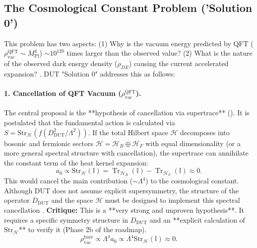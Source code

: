 \documentclass[11pt, a4paper]{article}
\theoremstyle{remark}
\newcommand{\Str}{\mathrm{Str}}
\DeclareMathOperator{\Tr}{Tr}
\newcommand{\Mpl}{M_{\mathrm{Pl}}}
\begin{document}
\subsection{The Cosmological Constant Problem ('Solution 0')}
\label{sec:problema_cc_final_revised}
This problem has two aspects: (1) Why is the vacuum energy predicted by QFT (\( \rho_{\text{vac}}^{\text{QFT}} \sim \Mpl^4 \)) \( \sim 10^{120} \) times larger than the observed value? (2) What is the nature of the observed dark energy density (\( \rho_{DE} \)) causing the current accelerated expansion? \citep{Weinberg1989CosmoConst}.
DUT "Solution 0" addresses this as follows:

\paragraph{1. Cancellation of QFT Vacuum (\( \rho_{\text{vac}}^{\text{QFT}} \)).}
The central proposal is the **hypothesis of cancellation via supertrace** (). It is postulated that the fundamental action is calculated via \( S = \Str_{\mathcal{H}}(f(D_{\text{DUT}}^2/\Lambda^2)) \). If the total Hilbert space \( \mathcal{H} \) decomposes into bosonic and fermionic sectors \( \mathcal{H} = \mathcal{H}_B \oplus \mathcal{H}_F \) with equal dimensionality (or a more general spectral structure with cancellation), the supertrace can annihilate the constant term of the heat kernel expansion:
\[
a_0 \propto \Str_{\mathcal{H}}(\mathbb{I}) = \Tr_{\mathcal{H}_B}(\mathbb{I}) - \Tr_{\mathcal{H}_F}(\mathbb{I}) \approx 0.
\]
This would cancel the main contribution (\(\sim \Lambda^4\)) to the cosmological constant. Although DUT does not assume explicit supersymmetry, the structure of the operator \( D_{\text{DUT}} \) and the space \( \mathcal{H} \) must be designed to implement this spectral cancellation \citep{ChamseddineConnes1997}.
\textbf{Critique:} This is a **very strong and unproven hypothesis**. It requires a specific symmetry structure in \( D_{\text{DUT}} \) and an **explicit calculation of \( \Str_{\mathcal{H}} \)** to verify it (Phase 2b of the roadmap).
\begin{equation} \label{eq:cancelacion_vacio_str_final_redux}
 \rho_{\text{vac}}^{\text{bare}} \propto \Lambda^4 a_0 \propto \Lambda^4 \Str_{\mathcal{H}}(\mathbb{I}) \approx 0.
\end{equation}
\end{document}
